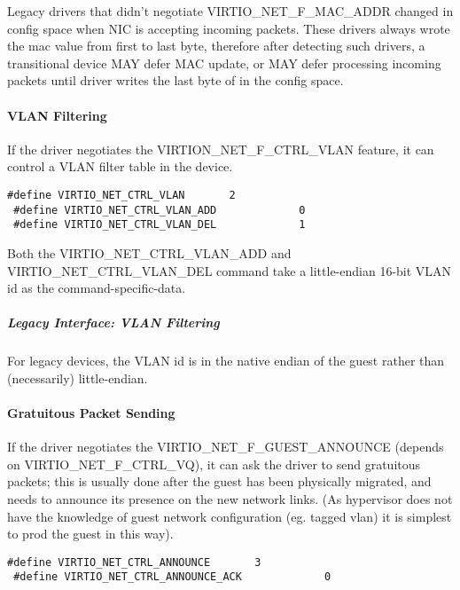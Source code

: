 Legacy drivers that didn't negotiate VIRTIO_NET_F_MAC_ADDR
changed  in config space when NIC is accepting
incoming packets. These drivers always wrote the mac value from
first to last byte, therefore after detecting such drivers,
a transitional device MAY defer MAC update, or MAY defer
processing incoming packets until driver writes the last byte
of  in the config space.

\paragraph{VLAN Filtering}\label{sec:Device Types / Network Device / Device Operation / Control Virtqueue / VLAN Filtering}

If the driver negotiates the VIRTION_NET_F_CTRL_VLAN feature, it
can control a VLAN filter table in the device.

\begin{lstlisting}
#define VIRTIO_NET_CTRL_VLAN       2
 #define VIRTIO_NET_CTRL_VLAN_ADD             0
 #define VIRTIO_NET_CTRL_VLAN_DEL             1
\end{lstlisting}

Both the VIRTIO_NET_CTRL_VLAN_ADD and VIRTIO_NET_CTRL_VLAN_DEL
command take a little-endian 16-bit VLAN id as the command-specific-data.

\subparagraph{Legacy Interface: VLAN Filtering}\label{sec:Device Types / Network Device / Device Operation / Control Virtqueue / VLAN Filtering / Legacy Interface: VLAN Filtering}
For legacy devices, the VLAN id is in the
native endian of the guest rather than (necessarily) little-endian.

\paragraph{Gratuitous Packet Sending}\label{sec:Device Types / Network Device / Device Operation / Control Virtqueue / Gratuitous Packet Sending}

If the driver negotiates the VIRTIO_NET_F_GUEST_ANNOUNCE (depends
on VIRTIO_NET_F_CTRL_VQ), it can ask the driver to send gratuitous
packets; this is usually done after the guest has been physically
migrated, and needs to announce its presence on the new network
links. (As hypervisor does not have the knowledge of guest
network configuration (eg. tagged vlan) it is simplest to prod
the guest in this way).

\begin{lstlisting}
#define VIRTIO_NET_CTRL_ANNOUNCE       3
 #define VIRTIO_NET_CTRL_ANNOUNCE_ACK             0
\end{lstlisting}

